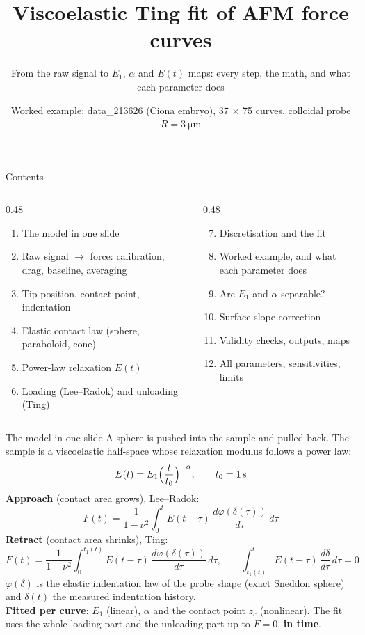 \documentclass[aspectratio=169,9pt]{beamer}
\title{Viscoelastic Ting fit of AFM force curves}
\subtitle{From the raw signal to $E_1$, $\alpha$ and $E(t)$ maps: every step, the math, and what each parameter does}
\date{Worked example: data\_213626 (Ciona embryo), 37 $\times$ 75 curves, colloidal probe $R=\SI{3}{\micro\metre}$}
\author{}
\begin{document}
\maketitle

\begin{frame}{Contents}
\begin{columns}[T]
\begin{column}{0.48\textwidth}
\begin{enumerate}
\item The model in one slide
\item Raw signal $\to$ force: calibration, drag, baseline, averaging
\item Tip position, contact point, indentation
\item Elastic contact law (sphere, paraboloid, cone)
\item Power-law relaxation $E(t)$
\item Loading (Lee--Radok) and unloading (Ting)
\end{enumerate}
\end{column}
\begin{column}{0.48\textwidth}
\begin{enumerate}\setcounter{enumi}{6}
\item Discretisation and the fit
\item Worked example, and what each parameter does
\item Are $E_1$ and $\alpha$ separable?
\item Surface-slope correction
\item Validity checks, outputs, maps
\item All parameters, sensitivities, limits
\end{enumerate}
\end{column}
\end{columns}
\end{frame}

\begin{frame}{The model in one slide}
\small
A sphere is pushed into the sample and pulled back. The sample is a viscoelastic half-space whose relaxation modulus follows a power law:
\[E(t)=E_1\Bigl(\frac{t}{t_0}\Bigr)^{-\alpha},\qquad t_0=\SI{1}{\second}\]
\textbf{Approach} (contact area grows), Lee--Radok:
\[F(t)=\frac{1}{1-\nu^2}\int_0^{t}E(t-\tau)\,\frac{d\varphi(\delta(\tau))}{d\tau}\,d\tau\]
\textbf{Retract} (contact area shrinks), Ting:
\[F(t)=\frac{1}{1-\nu^2}\int_0^{t_1(t)}E(t-\tau)\,\frac{d\varphi(\delta(\tau))}{d\tau}\,d\tau,\qquad \int_{t_1(t)}^{t}E(t-\tau)\,\frac{d\delta}{d\tau}\,d\tau=0\]
$\varphi(\delta)$ is the elastic indentation law of the probe shape (exact Sneddon sphere) and $\delta(t)$ the measured indentation history.\\[4pt]
\textbf{Fitted per curve}: $E_1$ (linear), $\alpha$ and the contact point $z_c$ (nonlinear). The fit uses the whole loading part and the unloading part up to $F=0$, \textbf{in time}.
\end{frame}
\end{document}
